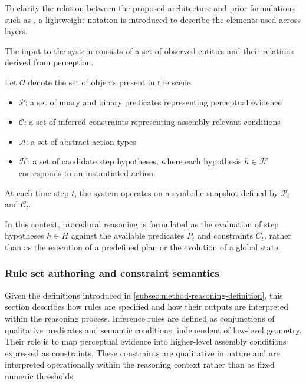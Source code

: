 \documentclass[11pt,titlepage,openright]{book}
\begin{document}
To clarify the relation between the proposed architecture and prior formulations such as \citet{Zhao2025VideoToBT}, a lightweight notation is introduced to describe the elements used across layers.

The input to the system consists of a set of observed entities and their relations derived from perception. 

Let $\mathcal{O}$ denote the set of objects present in the scene.

\begin{itemize}
  \item $\mathcal{P}$: a set of unary and binary predicates representing perceptual evidence

  \item $\mathcal{C}$: a set of inferred constraints representing assembly-relevant conditions

  \item $\mathcal{A}$: a set of abstract action types

  \item $\mathcal{H}$: a set of candidate step hypotheses, where each hypothesis $h \in \mathcal{H}$ corresponds to an instantiated action
\end{itemize}

At each time step $t$, the system operates on a symbolic snapshot defined by $\mathcal{P}_t$ and $\mathcal{C}_t$.

In this context, procedural reasoning is formulated as the evaluation of step hypotheses $h \in H$ against the available predicates $P_t$ and constraints $C_t$, rather than as the execution of a predefined plan or the evolution of a global state.


\subsubsection{Rule set authoring and constraint semantics}
\label{sec:rule-authoring}

Given the definitions introduced in \cref{subsec:method-reasoning-definition}, this section describes how rules are specified and how their outputs are interpreted within the reasoning process.
Inference rules are defined as conjunctions of qualitative predicates and semantic conditions, independent of low-level geometry. Their role is to map perceptual evidence into higher-level assembly conditions expressed as constraints. These constraints are qualitative in nature and are interpreted operationally within the reasoning context rather than as fixed numeric thresholds.
\end{document}
